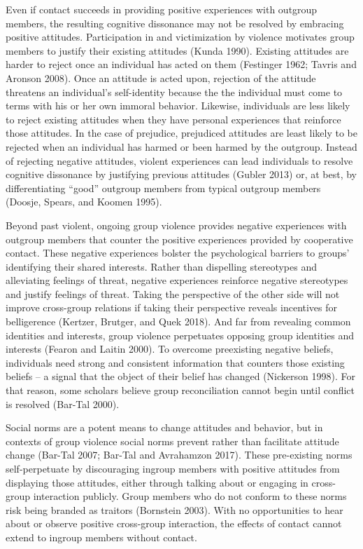 \documentclass[11pt]{article}
\begin{document}
Even if contact succeeds in providing positive experiences with outgroup
members, the resulting cognitive dissonance may not be resolved by
embracing positive attitudes. Participation in and victimization by
violence motivates group members to justify their existing attitudes
(Kunda 1990). Existing attitudes are harder to reject once an individual
has acted on them (Festinger 1962; Tavris and Aronson 2008). Once an
attitude is acted upon, rejection of the attitude threatens an
individual's self-identity because the the individual must come to terms
with his or her own immoral behavior. Likewise, individuals are less
likely to reject existing attitudes when they have personal experiences
that reinforce those attitudes. In the case of prejudice, prejudiced
attitudes are least likely to be rejected when an individual has harmed
or been harmed by the outgroup. Instead of rejecting negative attitudes,
violent experiences can lead individuals to resolve cognitive dissonance
by justifying previous attitudes (Gubler 2013) or, at best, by
differentiating ``good'' outgroup members from typical outgroup members
(Doosje, Spears, and Koomen 1995).

Beyond past violent, ongoing group violence provides negative
experiences with outgroup members that counter the positive experiences
provided by cooperative contact. These negative experiences bolster the
psychological barriers to groups' identifying their shared interests.
Rather than dispelling stereotypes and alleviating feelings of threat,
negative experiences reinforce negative stereotypes and justify feelings
of threat. Taking the perspective of the other side will not improve
cross-group relations if taking their perspective reveals incentives for
belligerence (Kertzer, Brutger, and Quek 2018). And far from revealing
common identities and interests, group violence perpetuates opposing
group identities and interests (Fearon and Laitin 2000). To overcome
preexisting negative beliefs, individuals need strong and consistent
information that counters those existing beliefs -- a signal that the
object of their belief has changed (Nickerson 1998). For that reason,
some scholars believe group reconciliation cannot begin until conflict
is resolved (Bar-Tal 2000).

Social norms are a potent means to change attitudes and behavior, but in
contexts of group violence social norms prevent rather than facilitate
attitude change (Bar-Tal 2007; Bar-Tal and Avrahamzon 2017). These
pre-existing norms self-perpetuate by discouraging ingroup members with
positive attitudes from displaying those attitudes, either through
talking about or engaging in cross-group interaction publicly. Group
members who do not conform to these norms risk being branded as traitors
(Bornstein 2003). With no opportunities to hear about or observe
positive cross-group interaction, the effects of contact cannot extend
to ingroup members without contact.
\end{document}
